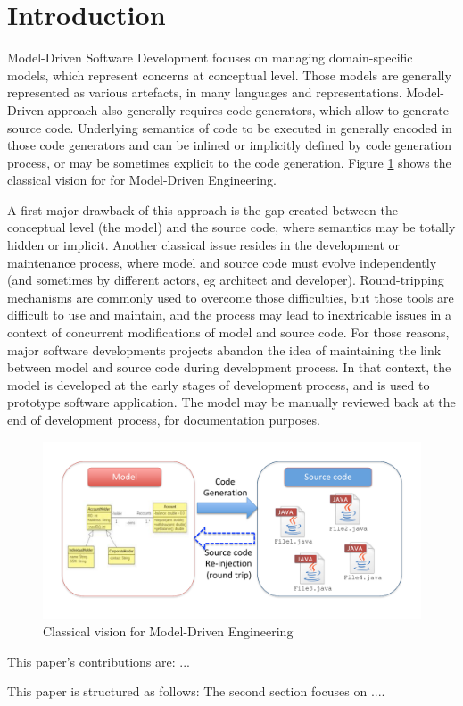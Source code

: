 \section{Introduction}

Model-Driven Software Development focuses on managing domain-specific models, which represent concerns at conceptual level. Those models are generally represented as various artefacts, in many languages and representations. Model-Driven approach also generally requires code generators, which allow to generate source code. Underlying semantics of code to be executed in generally encoded in those code generators and can be inlined or implicitly defined by code generation process, or may be sometimes explicit to the code generation. Figure \ref{fig:ClassicalVision} shows the classical vision for for Model-Driven Engineering.

A first major drawback of this approach is the gap created between the conceptual level (the model) and the source code, where semantics may be totally hidden or implicit. Another classical issue resides in the development or maintenance process, where model and source code must evolve independently (and sometimes by different actors, eg architect and developer). Round-tripping mechanisms are commonly used to overcome those difficulties, but those tools are difficult to use and maintain, and the process may lead to inextricable issues in a context of concurrent modifications of model  and source code. For those reasons, major software developments projects abandon the idea of maintaining the link between model and source code during development process. In that context, the model is developed at the early stages of development process, and is used to prototype software application. The model may be manually reviewed back at the end of development process, for documentation purposes.

\begin{figure}
    \centering
    \includegraphics[width=1.0 \columnwidth]{ClassicalVision.pdf}
    \caption{Classical vision for Model-Driven Engineering}
    \label{fig:ClassicalVision}
\end{figure}



This paper’s contributions are: ...


This paper is structured as follows: The second section focuses on .... 

